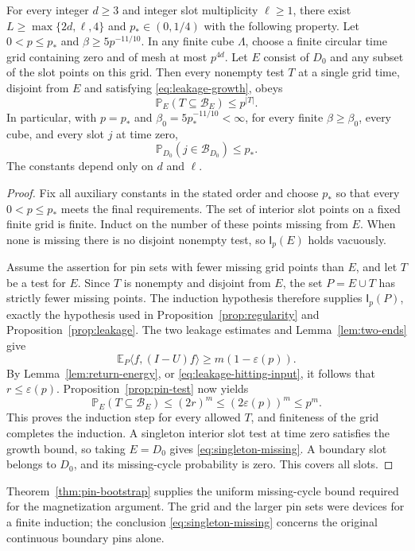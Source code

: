 \begin{theorem}\label{thm:pin-bootstrap}
For every integer $d\ge3$ and integer slot multiplicity $\ell\ge1$, there
exist $L\ge\max\{2d,\ell,4\}$ and $p_*\in(0,1/4)$ with the
following property.  Let $0<p\le p_*$ and
$\beta\ge5p^{-11/10}$.  In any finite cube $\Lambda$, choose a
finite circular time grid containing zero and of mesh at most
$p^{4d}$.  Let $E$ consist of $D_0$ and any subset of the slot
points on this grid.  Then every nonempty test $T$ at a single grid
time, disjoint from $E$ and satisfying
\eqref{eq:leakage-growth}, obeys
\begin{equation}\label{eq:bootstrap-closed}
                  \mathbb P_E(T\subseteq\mathcal B_E)\le p^{|T|}.
\end{equation}
In particular, with $p=p_*$ and
$\beta_0=5p_*^{-11/10}<\infty$, for every finite
$\beta\ge\beta_0$, every cube, and every slot $j$ at time zero,
\begin{equation}\label{eq:singleton-missing}
                  \mathbb P_{D_0}(j\in\mathcal B_{D_0})\le p_*.
\end{equation}
The constants depend only on $d$ and $\ell$.
\end{theorem}

\begin{proof}
Fix all auxiliary constants in the stated order and choose $p_*$ so
that every $0<p\le p_*$ meets the final requirements.  The set of
interior slot points on a fixed finite grid is finite.  Induct on the
number of these points missing from $E$.  When none is missing there
is no disjoint nonempty test, so $\mathsf I_p(E)$ holds vacuously.

Assume the assertion for pin sets with fewer missing grid points than
$E$, and let $T$ be a test for $E$.  Since $T$ is nonempty and
disjoint from $E$, the set $P=E\cup T$ has strictly fewer missing
points.  The induction hypothesis therefore supplies
$\mathsf I_p(P)$, exactly the hypothesis used in
Proposition~\ref{prop:regularity} and
Proposition~\ref{prop:leakage}.  The two leakage estimates and
Lemma~\ref{lem:two-ends} give
\[
             \mathbb E_P\langle f,(I-U)f\rangle
                         \ge m(1-\varepsilon(p)).
\]
By Lemma~\ref{lem:return-energy}, or
\eqref{eq:leakage-hitting-input}, it follows that
$r\le\varepsilon(p)$.  Proposition~\ref{prop:pin-test} now yields
\[
 \mathbb P_E(T\subseteq\mathcal B_E)
        \le(2r)^m\le(2\varepsilon(p))^m\le p^m.
\]
This proves the induction step for every allowed $T$, and finiteness
of the grid completes the induction.  A singleton interior slot test
at time zero satisfies the growth bound, so taking $E=D_0$ gives
\eqref{eq:singleton-missing}.  A boundary slot belongs to $D_0$,
and its missing-cycle probability is zero.  This covers all slots.
\end{proof}

Theorem~\ref{thm:pin-bootstrap} supplies the uniform missing-cycle
bound required for the magnetization argument.  The grid and the
larger pin sets were devices for a finite induction; the conclusion
\eqref{eq:singleton-missing} concerns the original continuous
boundary pins alone.

